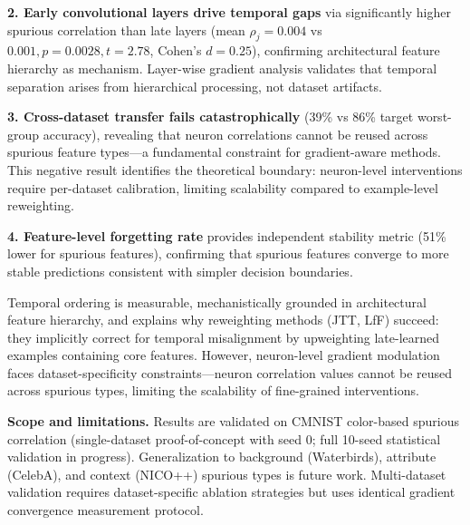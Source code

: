 \textbf{2. Early convolutional layers drive temporal gaps} via significantly higher spurious correlation than late layers (mean $\rho_j=0.004$ vs $0.001, p=0.0028, t=2.78$, Cohen's $d=0.25$), confirming architectural feature hierarchy as mechanism. Layer-wise gradient analysis validates that temporal separation arises from hierarchical processing, not dataset artifacts.

\textbf{3. Cross-dataset transfer fails catastrophically} (39\% vs 86\% target worst-group accuracy), revealing that neuron correlations cannot be reused across spurious feature types---a fundamental constraint for gradient-aware methods. This negative result identifies the theoretical boundary: neuron-level interventions require per-dataset calibration, limiting scalability compared to example-level reweighting.

\textbf{4. Feature-level forgetting rate} provides independent stability metric (51\% lower for spurious features), confirming that spurious features converge to more stable predictions consistent with simpler decision boundaries.

Temporal ordering is measurable, mechanistically grounded in architectural feature hierarchy, and explains why reweighting methods (JTT, LfF) succeed: they implicitly correct for temporal misalignment by upweighting late-learned examples containing core features. However, neuron-level gradient modulation faces dataset-specificity constraints---neuron correlation values cannot be reused across spurious types, limiting the scalability of fine-grained interventions.

\textbf{Scope and limitations.} Results are validated on CMNIST color-based spurious correlation (single-dataset proof-of-concept with seed 0; full 10-seed statistical validation in progress). Generalization to background (Waterbirds), attribute (CelebA), and context (NICO++) spurious types is future work. Multi-dataset validation requires dataset-specific ablation strategies but uses identical gradient convergence measurement protocol.
